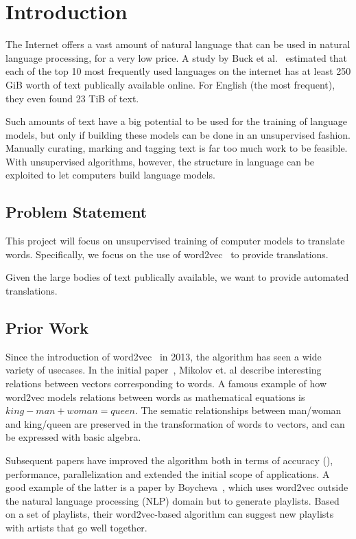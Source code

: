 \section{Introduction}
The Internet offers a vast amount of natural language that can be used in natural language processing, for a very low price. A study by Buck et al.~\cite{buck2014n} estimated that each of the top 10 most frequently used languages on the internet has at least 250 GiB worth of text publically available online. For English (the most frequent), they even found 23 TiB of text.

Such amounts of text have a big potential to be used for the training of language models, but only if building these models can be done in an unsupervised fashion. Manually curating, marking and tagging text is far too much work to be feasible. With unsupervised algorithms, however, the structure in language can be exploited to let computers build language models.

\subsection{Problem Statement}
This project will focus on unsupervised training of computer models to translate words. Specifically, we focus on the use of word2vec~\cite{mikolov2013efficient} to provide translations.

Given the large bodies of text publically available, we want to provide automated translations. 

\subsection{Prior Work}
\label{sec:prior_work}
Since the introduction of word2vec~\cite{mikolov2013efficient, mikolov2013distributed} in 2013, the algorithm has seen a wide variety of usecases. In the initial paper~\cite{mikolov2013efficient}, Mikolov et. al describe interesting relations between vectors corresponding to words. 
A famous example of how word2vec models relations between words as mathematical equations is $king - man + woman = queen$.
The sematic relationships between man/woman and king/queen are preserved in the transformation of words to vectors, and can be expressed with basic algebra.

Subsequent papers have improved the algorithm both in terms of accuracy (\cite{levy2014linguistic}), performance, parallelization and extended the initial scope of applications. A good example of the latter is a paper by Boycheva~\cite{boycheva2015distributional}, which uses word2vec outside the natural language processing (NLP) domain but to generate playlists. Based on a set of playlists, their word2vec-based algorithm can suggest new playlists with artists that go well together.

